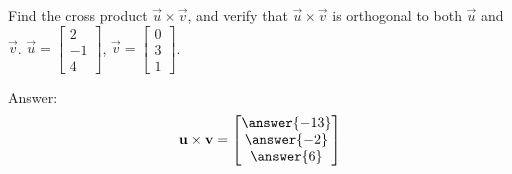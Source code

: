 \documentclass{ximera}
\begin{document}
\begin{problem}\label{prob:crossuv1} Find the cross product $\vec{u}\times\vec{v}$, and verify that $\vec{u}\times\vec{v}$ is orthogonal to both $\vec{u}$ and $\vec{v}$.
$\vec{u}=\begin{bmatrix}2\\-1\\4\end{bmatrix}$, $\vec{v}=\begin{bmatrix}0\\3\\1\end{bmatrix}$.

Answer:
$$\vec{u}\times\vec{v}=\begin{bmatrix}\answer{-13}\\\answer{-2}\\\answer{6}\end{bmatrix}$$
\end{problem}




\end{document}
